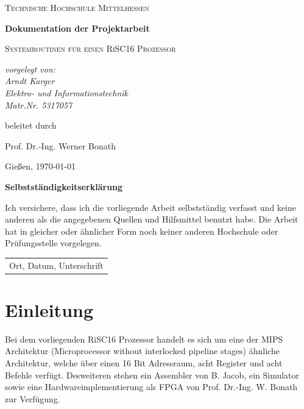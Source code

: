 \documentclass[fleqn, a4paper, 1pt]{article}       %
\begin{document}
\begin{titlepage}
	\centering
	{\scshape\LARGE Technische Hochschule Mittelhessen \par}
	\vspace{1cm}
	{\huge\bfseries Dokumentation der Projektarbeit \par}
	\vspace{1.5cm}
	{\scshape\Large Systemroutinen für einen RiSC16 Prozessor \par}
	\vspace{2cm}
	{\Large\itshape vorgelegt von: \\ Arndt Karger \\ Elektro-  und Informationstechnik\\ Matr.Nr. 5317057\par}
	\vfill
	beleitet durch\par
    Prof. Dr.-Ing. Werner Bonath
	\vfill

	{\large Gießen, \today\par}
\end{titlepage}

\thispagestyle{empty}
{\huge\bfseries Selbstständigkeitserklärung \par}
\vspace{1cm}

\noindent Ich versichere, dass ich die vorliegende Arbeit selbstständig verfasst und keine anderen als die angegebenen
Quellen und Hilfsmittel benutzt habe. Die Arbeit hat in gleicher oder ähnlicher Form noch keiner anderen
Hochschule oder Prüfungsstelle vorgelegen.

\vspace{4cm}
\begin{flushleft}
\begin{tabular}{@{}l@{}}\hline
Ort, Datum, Unterschrift
\end{tabular}
\end{flushleft}

\newpage
\thispagestyle{empty}
\tableofcontents
\newpage
\setcounter{page}{1}

\section{Einleitung}
Bei dem vorliegenden RiSC16 Prozessor handelt es sich um eine der MIPS Architektur (Microprocessor without interlocked pipeline stages) \cite{MIPS} ähnliche Architektur, welche über einen 16 Bit Adressraum, acht Register und acht Befehle verfügt. Desweiteren stehen ein Assembler von B. Jacob, ein Simulator sowie eine Hardwareimplementierung als FPGA von Prof. Dr.-Ing. W. Bonath zur Verfügung.
\end{document}
